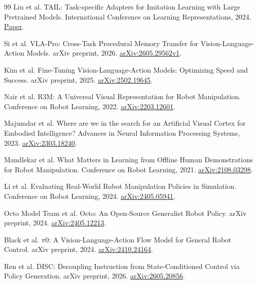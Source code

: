 \documentclass[10pt,twocolumn,letterpaper]{article}
\begin{document}
{\begin{thebibliography}{99}
Liu et al. TAIL: Task-specific Adapters for Imitation Learning with Large Pretrained Models. International Conference on Learning Representations, 2024. \href{https://proceedings.iclr.cc/paper_files/paper/2024/hash/46e2b525da536030ec1589dddea01feb-Abstract-Conference.html}{Paper}.

Si et al. VLA-Pro: Cross-Task Procedural Memory Transfer for Vision-Language-Action Models. arXiv preprint, 2026. \href{https://arxiv.org/abs/2605.29562v1}{arXiv:2605.29562v1}.

Kim et al. Fine-Tuning Vision-Language-Action Models: Optimizing Speed and Success. arXiv preprint, 2025. \href{https://arxiv.org/abs/2502.19645}{arXiv:2502.19645}.

Nair et al. R3M: A Universal Visual Representation for Robot Manipulation. Conference on Robot Learning, 2022. \href{https://arxiv.org/abs/2203.12601}{arXiv:2203.12601}.

Majumdar et al. Where are we in the search for an Artificial Visual Cortex for Embodied Intelligence? Advances in Neural Information Processing Systems, 2023. \href{https://arxiv.org/abs/2303.18240}{arXiv:2303.18240}.

Mandlekar et al. What Matters in Learning from Offline Human Demonstrations for Robot Manipulation. Conference on Robot Learning, 2021. \href{https://arxiv.org/abs/2108.03298}{arXiv:2108.03298}.

Li et al. Evaluating Real-World Robot Manipulation Policies in Simulation. Conference on Robot Learning, 2024. \href{https://arxiv.org/abs/2405.05941}{arXiv:2405.05941}.

Octo Model Team et al. Octo: An Open-Source Generalist Robot Policy. arXiv preprint, 2024. \href{https://arxiv.org/abs/2405.12213}{arXiv:2405.12213}.

Black et al. \ensuremath{\pi}0: A Vision-Language-Action Flow Model for General Robot Control. arXiv preprint, 2024. \href{https://arxiv.org/abs/2410.24164}{arXiv:2410.24164}.

Ren et al. DISC: Decoupling Instruction from State-Conditioned Control via Policy Generation. arXiv preprint, 2026. \href{https://arxiv.org/abs/2605.20856}{arXiv:2605.20856}.

\end{thebibliography}
}

\clearpage\onecolumn
\appendix
\end{document}
